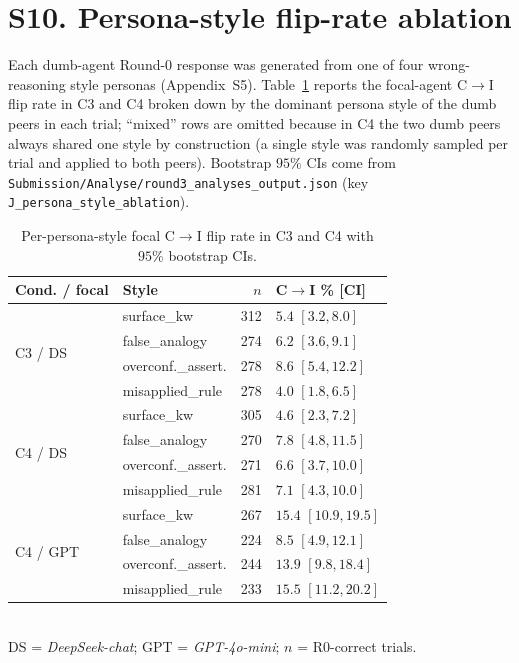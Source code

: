 \documentclass[11pt]{article}
\begin{document}
\section*{S10. Persona-style flip-rate ablation}
\label{ssec:persona_ablation}

Each dumb-agent Round-0 response was generated from one of four
wrong-reasoning style personas (Appendix~S5).
Table~\ref{stab:persona_ablation} reports the focal-agent
C$\rightarrow$I flip rate in C3 and C4 broken down by the dominant
persona style of the dumb peers in each trial; ``mixed'' rows are
omitted because in C4 the two dumb peers always shared one style by
construction (a single style was randomly sampled per trial and
applied to both peers).
Bootstrap $95\%$ CIs come from
\texttt{Submission/\allowbreak Analyse/\allowbreak round3\_\allowbreak analyses\_\allowbreak output.json}
(key \texttt{J\_persona\_\allowbreak style\_ablation}).

\begin{table}[h]
\centering\footnotesize
\caption{Per-persona-style focal C$\rightarrow$I flip rate in C3 and
C4 with $95\%$ bootstrap CIs.
\label{stab:persona_ablation}}
\begin{tabular}{@{}llrl@{}}
\toprule
Cond. / focal & Style & $n$ & C$\to$I \% [CI] \\
\midrule
\multirow{4}{*}{C3 / DS}
  & surface\_kw    & 312 & $5.4$ $[3.2, 8.0]$ \\
  & false\_analogy & 274 & $6.2$ $[3.6, 9.1]$ \\
  & overconf.\_assert. & 278 & $8.6$ $[5.4, 12.2]$ \\
  & misapplied\_rule  & 278 & $4.0$ $[1.8, 6.5]$ \\
\midrule
\multirow{4}{*}{C4 / DS}
  & surface\_kw    & 305 & $4.6$ $[2.3, 7.2]$ \\
  & false\_analogy & 270 & $7.8$ $[4.8, 11.5]$ \\
  & overconf.\_assert. & 271 & $6.6$ $[3.7, 10.0]$ \\
  & misapplied\_rule  & 281 & $7.1$ $[4.3, 10.0]$ \\
\midrule
\multirow{4}{*}{C4 / GPT}
  & surface\_kw    & 267 & $15.4$ $[10.9, 19.5]$ \\
  & false\_analogy & 224 & $8.5$ $[4.9, 12.1]$ \\
  & overconf.\_assert. & 244 & $13.9$ $[9.8, 18.4]$ \\
  & misapplied\_rule  & 233 & $15.5$ $[11.2, 20.2]$ \\
\bottomrule
\end{tabular}
\\[1pt]
{\scriptsize DS = \textit{DeepSeek-chat}; GPT = \textit{GPT-4o-mini};
$n$ = R0-correct trials.}
\end{table}
\end{document}
